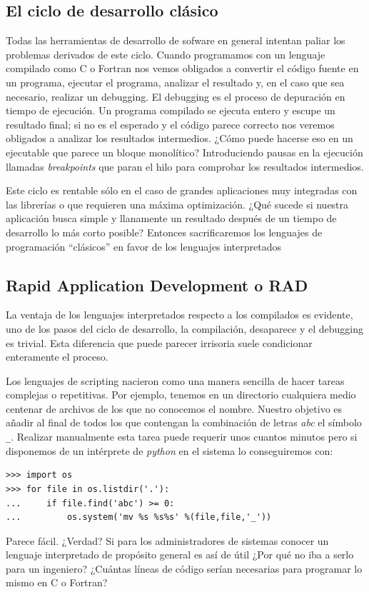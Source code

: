\subsection{El ciclo de desarrollo clásico}

Todas las herramientas de desarrollo de sofware en general intentan
paliar los problemas derivados de este ciclo. Cuando programamos con
un lenguaje compilado como C o Fortran nos vemos obligados a convertir
el código fuente en un programa, ejecutar el programa, analizar el
resultado y, en el caso que sea necesario, realizar un debugging.  El
debugging es el proceso de depuración en tiempo de ejecución. Un
programa compilado se ejecuta entero y escupe un resultado final; si
no es el esperado y el código parece correcto nos veremos obligados a
analizar los resultados intermedios. ¿Cómo puede hacerse eso en un
ejecutable que parece un bloque monolítico? Introduciendo pausas en la
ejecución llamadas \emph{breakpoints} que paran el hilo para comprobar
los resultados intermedios.

Este ciclo es rentable sólo en el caso de grandes aplicaciones muy
integradas con las librerías o que requieren una máxima optimización.
¿Qué sucede si nuestra aplicación busca simple y llanamente un
resultado después de un tiempo de desarrollo lo más corto posible?
Entonces sacrificaremos los lenguajes de programación {}``clásicos''
en favor de los lenguajes interpretados


\subsection{Rapid Application Development o RAD}

La ventaja de los lenguajes interpretados respecto a los compilados es
evidente, uno de los pasos del ciclo de desarrollo, la compilación,
desaparece y el debugging es trivial. Esta diferencia que puede
parecer irrisoria suele condicionar enteramente el proceso.

Los lenguajes de scripting nacieron como una manera sencilla de hacer
tareas complejas o repetitivas. Por ejemplo, tenemos en un directorio
cualquiera medio centenar de archivos de los que no conocemos el nombre.
Nuestro objetivo es añadir al final de todos los que contengan la
combinación de letras \emph{abc} el símbolo \texttt{\_}. Realizar
manualmente esta tarea puede requerir unos cuantos minutos pero si
disponemos de un intérprete de \emph{python} en el sistema lo
conseguiremos con:

  \begin{verbatim}
>>> import os
>>> for file in os.listdir('.'):
...     if file.find('abc') >= 0:
...         os.system('mv %s %s%s' %(file,file,'_'))
\end{verbatim}
Parece fácil. ¿Verdad? Si para los administradores de sistemas
conocer un lenguaje interpretado de propósito general es así de útil
¿Por qué no iba a serlo para un ingeniero? ¿Cuántas líneas de código
serían necesarias para programar lo mismo en C o Fortran?


